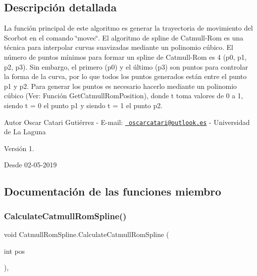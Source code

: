 \subsection{Descripción detallada}
La función principal de este algoritmo es generar la trayectoria de movimiento del Scorbot en el comando \char`\"{}movec\char`\"{}. El algoritmo de spline de Catmull-\/\+Rom es una técnica para interpolar curvas suavizadas mediante un polinomio cúbico. El número de puntos mínimos para formar un spline de Catmull-\/\+Rom es 4 (p0, p1, p2, p3). Sin embargo, el primero (p0) y el último (p3) son puntos para controlar la forma de la curva, por lo que todos los puntos generados están entre el punto p1 y p2. Para generar los puntos es necesario hacerlo mediante un polinomio cúbico (Ver\+: Función Get\+Catmull\+Rom\+Position), donde t toma valores de 0 a 1, siendo t = 0 el punto p1 y siendo t = 1 el punto p2. \begin{DoxyAuthor}{Autor}
Oscar Catari Gutiérrez -\/ E-\/mail\+: \href{mailto:oscarcatari@outlook.es}{\texttt{ oscarcatari@outlook.\+es}} -\/ Universidad de La Laguna 
\end{DoxyAuthor}
\begin{DoxyVersion}{Versión}
1. 
\end{DoxyVersion}
\begin{DoxySince}{Desde}
02-\/05-\/2019 
\end{DoxySince}


\subsection{Documentación de las funciones miembro}
\mbox{\label{class_catmull_rom_spline_a0bf2480dc2c46201f8ac5937a179ea4e}} 
\subsubsection{\texorpdfstring{CalculateCatmullRomSpline()}{CalculateCatmullRomSpline()}}
{\footnotesize\ttfamily void Catmull\+Rom\+Spline.\+Calculate\+Catmull\+Rom\+Spline (\begin{DoxyParamCaption}\item[{int}]{pos }\end{DoxyParamCaption})\hspace{0.3cm}{\ttfamily [inline]}, {\ttfamily [private]}}

